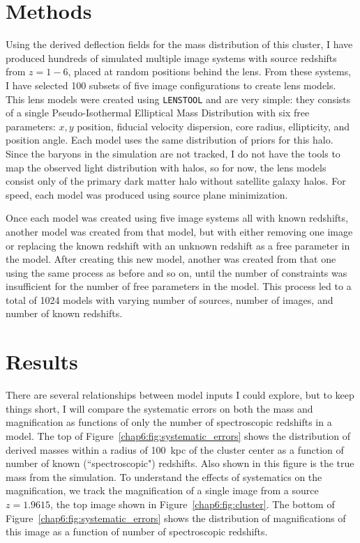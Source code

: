 \section{Methods}

Using the derived deflection fields for the mass distribution of this cluster, I have produced hundreds of simulated multiple image systems with source redshifts from $z=1-6$, placed at random positions behind the lens. From these systems, I have selected 100 subsets of five image configurations to create lens models. This lens models were created using \texttt{LENSTOOL} and are very simple: they consists of a single Pseudo-Isothermal Elliptical Mass Distribution with six free parameters: $x,y$ position, fiducial velocity dispersion, core radius, ellipticity, and position angle. Each model uses the same distribution of priors for this halo. Since the baryons in the simulation are not tracked, I do not have the tools to map the observed light distribution with halos, so for now, the lens models consist only of the primary dark matter halo without satellite galaxy halos. For speed, each model was produced using source plane minimization.

Once each model was created using five image systems all with known redshifts, another model was created from that model, but with either removing one image or replacing the known redshift with an unknown redshift as a free parameter in the model. After creating this new model, another was created from that one using the same process as before and so on, until the number of constraints was insufficient for the number of free parameters in the model. This process led to a total of 1024 models with varying number of sources, number of images, and number of known redshifts.

\section{Results}

There are several relationships between model inputs I could explore, but to keep things short, I will compare the systematic errors on both the mass and magnification as functions of only the number of spectroscopic redshifts in a model. The top of Figure~\ref{chap6:fig:systematic_errors} shows the distribution of derived masses within a radius of 100~kpc of the cluster center as a function of number of known (``spectroscopic") redshifts. Also shown in this figure is the true mass from the simulation. To understand the effects of systematics on the magnification, we track the magnification of a single image from a source $z=1.9615$, the top image shown in Figure~\ref{chap6:fig:cluster}. The bottom of Figure~\ref{chap6:fig:systematic_errors} shows the distribution of magnifications of this image as a function of number of spectroscopic redshifts.

